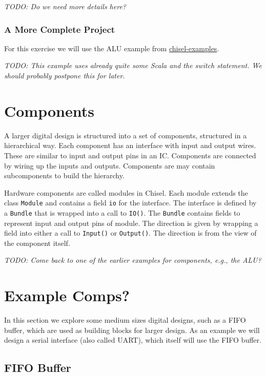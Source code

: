 \documentclass[%
    10pt, %
    headinclude, footexclude,
    openright, %
    notitlepage,
    cleardoubleempty,
    headsepline,
    pointlessnumbers,
    bibtotoc, idxtotoc,
    ]{scrbook}
\newcommand{\code}[1]{{\small{\texttt{#1}}}}
\newcommand{\todo}[1]{{\emph{TODO: #1}}}
\newcommand{\myref}[2]{\href{#1}{#2}}
\begin{document}
\todo{Do we need more details here?}

\subsection{A More Complete Project}


For this exercise we will use the ALU example from \myref{https://github.com/schoeberl/chisel-examples}{chisel-examples}.

\todo{This example uses already quite some Scala and the switch statement.
We should probably postpone this for later.}


\chapter{Components}

A larger digital design is structured into a set of components, structured in
a hierarchical way. Each component has an interface with input and output
wires. These are similar to input and output pins in an IC.
Components are connected by wiring up the inputs and outputs.
Components are may contain subcomponents to build the hierarchy.

Hardware components are called modules in Chisel. Each module extends
the class \code{Module} and contains a field \code{io} for the interface.
The interface is defined by a \code{Bundle} that is wrapped into a call to \code{IO()}.
The \code{Bundle} contains fields to represent input and output pins of
module. The direction is given by wrapping a field into either a call to \code{Input()}
or \code{Output()}. The direction is from the view of the component itself.

\todo{Come back to one of the earlier examples for components, e.g., the ALU?}




\chapter{Example Comps?}



In this section we explore some medium sizes digital designs, such as
a FIFO buffer, which are used as building blocks for larger design.
As an example we will design a serial interface (also called UART),
which itself will use the FIFO buffer.

\section{FIFO Buffer}
\end{document}
